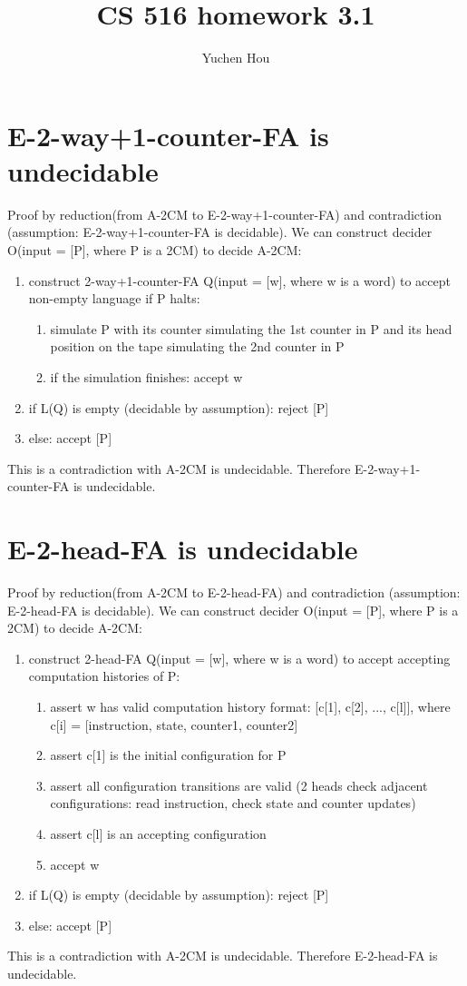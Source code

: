 \documentclass{article}
\begin{document}
\lstset{language=python, tabsize=4}
\title{CS 516 homework 3.1}
\author{Yuchen Hou}
\maketitle

\section{E-2-way+1-counter-FA is undecidable}
Proof by reduction(from A-2CM to E-2-way+1-counter-FA) and contradiction 
(assumption: E-2-way+1-counter-FA is decidable).
We can construct decider O(input = [P], where P is a 2CM) to decide A-2CM:
\begin{enumerate}
	\item construct 2-way+1-counter-FA Q(input = [w], where w is a word) to 
	accept non-empty language if P halts:
	\begin{enumerate}
		\item simulate P with its counter simulating the 1st counter in P and its head position on the tape simulating the 2nd counter in P
		\item if the simulation finishes: accept w
	\end{enumerate}
	\item if L(Q) is empty (decidable by assumption): reject [P]
	\item else: accept [P]
\end{enumerate}
This is a contradiction with A-2CM is undecidable. Therefore E-2-way+1-counter-FA is undecidable.

\section{E-2-head-FA is undecidable}
Proof by reduction(from A-2CM to E-2-head-FA) and contradiction (assumption: 
E-2-head-FA is decidable).
We can construct decider O(input = [P], where P is a 2CM) to decide A-2CM:
\begin{enumerate}
	\item construct 2-head-FA Q(input = [w], where w is a word) to accept accepting computation histories of P:
	\begin{enumerate}
		\item assert w has valid computation history format: [c[1], c[2], ..., c[l]], where c[i] = [instruction, state, counter1, counter2]
		\item assert c[1] is the initial configuration for P
		\item assert all configuration transitions are valid (2 heads check adjacent configurations: read instruction, check state and counter updates)
		\item assert c[l] is an accepting configuration
		\item accept w
	\end{enumerate}
	\item if L(Q) is empty (decidable by assumption): reject [P]
	\item else: accept [P]
\end{enumerate}
This is a contradiction with A-2CM is undecidable. Therefore E-2-head-FA is undecidable.
\end{document}
